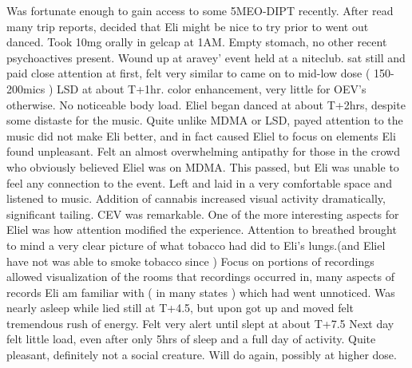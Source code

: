 \documentclass[12pt]{book}
\begin{document}
Was fortunate enough to gain access to some 5MEO-DIPT recently. After read many trip reports, decided that Eli might be nice to try prior to went out danced. Took 10mg orally in gelcap at 1AM. Empty stomach, no other recent psychoactives present. Wound up at aravey' event held at a niteclub. sat still and paid close attention at first, felt very similar to came on to mid-low dose ( 150-200mics ) LSD at about T+1hr. color enhancement, very little for OEV's otherwise. No noticeable body load. Eliel began danced at about T+2hrs, despite some distaste for the music. Quite unlike MDMA or LSD, payed attention to the music did not make Eli better, and in fact caused Eliel to focus on elements Eli found unpleasant. Felt an almost overwhelming antipathy for those in the crowd who obviously believed Eliel was on MDMA. This passed, but Eli was unable to feel any connection to the event. Left and laid in a very comfortable space and listened to music. Addition of cannabis increased visual activity dramatically, significant tailing. CEV was remarkable. One of the more interesting aspects for Eliel was how attention modified the experience. Attention to breathed brought to mind a very clear picture of what tobacco had did to Eli's lungs.(and Eliel have not was able to smoke tobacco since ) Focus on portions of recordings allowed visualization of the rooms that recordings occurred in, many aspects of records Eli am familiar with ( in many states ) which had went unnoticed. Was nearly asleep while lied still at T+4.5, but upon got up and moved felt tremendous rush of energy. Felt very alert until slept at about T+7.5 Next day felt little load, even after only 5hrs of sleep and a full day of activity. Quite pleasant, definitely not a social creature. Will do again, possibly at higher dose.
\end{document}
